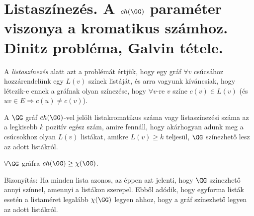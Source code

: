 \chapter{Listaszínezés. A $ch(\GG)$ paraméter viszonya a kromatikus számhoz. Dinitz probléma, Galvin tétele.}

\begin{dfn}
  A \emph{listaszínezés} alatt azt a problémát értjük, hogy egy gráf $\forall v$ csúcsához hozzárendelünk egy $L(v)$ színek listáját, és arra vagyunk kíváncsiak, hogy létezik-e ennek a gráfnak olyan színezése, hogy $\forall v$-re $v$ színe $c(v) \in L(v)$ (és $uv \in E \Rightarrow c(u) \not = c(v)$).
\end{dfn}

\begin{dfn}
  A $\GG$ gráf $ch(\GG)$-vel jelölt listakromatikus száma vagy listaszínezési száma az a legkisebb $k$ pozitív egész szám, amire fennáll, hogy akárhogyan adunk meg a csúcsokhoz olyan $L(v)$ listákat, amikre $L(v)\geq k$ teljesül, $\GG$ színezhető lesz az adott listákról.
\end{dfn}

\begin{thm}
  $\forall \GG$ gráfra $ch(\GG) \geq \chi(\GG)$.
\end{thm}

Bizonyítás: Ha minden lista azonos, az éppen azt jelenti, hogy $\GG$ színezhető annyi színnel, amennyi a listákon szerepel. Ebből adódik, hogy egyforma listák esetén a listaméret legalább $\chi (\GG)$ legyen ahhoz, hogy a gráf színezhető legyen az adott listákról.
